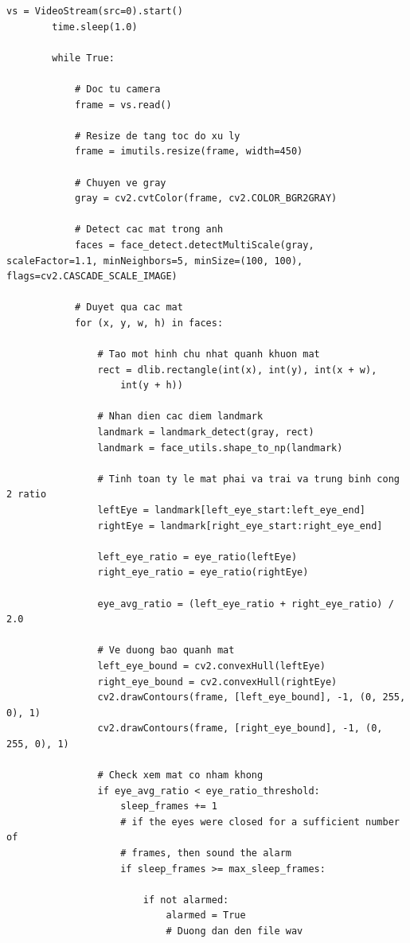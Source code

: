     \begin{lstlisting}[caption={Doc tu camera}]
        vs = VideoStream(src=0).start()
        time.sleep(1.0)

        while True:

            # Doc tu camera
            frame = vs.read()

            # Resize de tang toc do xu ly
            frame = imutils.resize(frame, width=450)

            # Chuyen ve gray
            gray = cv2.cvtColor(frame, cv2.COLOR_BGR2GRAY)

            # Detect cac mat trong anh
            faces = face_detect.detectMultiScale(gray, scaleFactor=1.1,	minNeighbors=5, minSize=(100, 100),	flags=cv2.CASCADE_SCALE_IMAGE)

            # Duyet qua cac mat
            for (x, y, w, h) in faces:

                # Tao mot hinh chu nhat quanh khuon mat
                rect = dlib.rectangle(int(x), int(y), int(x + w),
                    int(y + h))

                # Nhan dien cac diem landmark
                landmark = landmark_detect(gray, rect)
                landmark = face_utils.shape_to_np(landmark)

                # Tinh toan ty le mat phai va trai va trung binh cong 2 ratio
                leftEye = landmark[left_eye_start:left_eye_end]
                rightEye = landmark[right_eye_start:right_eye_end]

                left_eye_ratio = eye_ratio(leftEye)
                right_eye_ratio = eye_ratio(rightEye)

                eye_avg_ratio = (left_eye_ratio + right_eye_ratio) / 2.0

                # Ve duong bao quanh mat
                left_eye_bound = cv2.convexHull(leftEye)
                right_eye_bound = cv2.convexHull(rightEye)
                cv2.drawContours(frame, [left_eye_bound], -1, (0, 255, 0), 1)
                cv2.drawContours(frame, [right_eye_bound], -1, (0, 255, 0), 1)

                # Check xem mat co nham khong
                if eye_avg_ratio < eye_ratio_threshold:
                    sleep_frames += 1
                    # if the eyes were closed for a sufficient number of
                    # frames, then sound the alarm
                    if sleep_frames >= max_sleep_frames:

                        if not alarmed:
                            alarmed = True
                            # Duong dan den file wav



\end{lstlisting}

